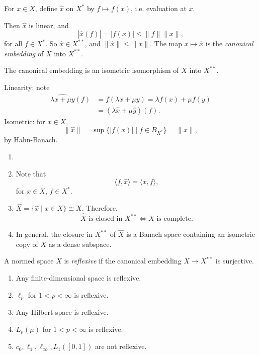\documentclass[12pt]{article}
\begin{document}
For $x \in X$, define $\hat x$ on $X^\ast$ by $f \mapsto f(x)$, i.e. evaluation at $x$.

Then $\hat x$ is linear, and
\[
|\hat x(f)| = |f(x)| \leq \|f\| \|x\|,
\]
for all $f \in X^\ast$. So $\hat x \in X^{\ast\ast}$, and $\|\hat x\| \leq \|x\|$. The map $x \mapsto \hat x$ is the \emph{canonical embedding} of $X$ into $X^{\ast\ast}$.

\begin{theorem}
	The canonical embedding is an isometric isomorphism of $X$ into $X^{\ast\ast}$.
\end{theorem}

\begin{proofbox}
	Linearity: note
	\begin{align*}
		\widehat{\lambda x + \mu y}(f) &= f(\lambda x + \mu y) = \lambda f(x) + \mu f(y) \\
					       &= (\lambda \hat x + \mu \hat y)(f).
	\end{align*}
	Isometric: for $x \in X$,
	\[
		\|\hat x\| = \sup\{|f(x)| \mid f \in B_{X^\ast} \} = \|x\|,
	\]
	by Hahn-Banach.
\end{proofbox}

\begin{remark}
	\begin{enumerate}
		\item[]
		\item Note that
			\[
			\langle f, \hat x \rangle = \langle x, f \rangle,
			\]
			for $x \in X$, $f \in X^\ast$.
		\item $\hat X = \{\hat x \mid x \in X \} \cong X$. Therefore,
			\[
				\hat X \text{ is closed in } X^{\ast\ast} \iff X \text{ is complete}.
			\]
		\item In general, the closure in $X^{\ast\ast}$ of $\hat X$ is a Banach space containing an isometric copy of $X$ as a dense subspace.
	\end{enumerate}
\end{remark}

\begin{definition}
	A normed space $X$ is \emph{reflexive} if the canonical embedding $X \to X^{\ast\ast}$ is surjective.
\end{definition}

\begin{exbox}
	\begin{enumerate}
	\item Any finite-dimensional space is reflexive.
	\item $\ell_p$ for $1 < p < \infty$ is reflexive.
	\item 	Any Hilbert space is reflexive.
	\item $L_p(\mu)$ for $1 < p < \infty$ is reflexive.
	\item $c_0, \ell_1, \ell_\infty, L_1([0, 1])$ are not reflexive.
\end{enumerate}
\end{exbox}
\end{document}
